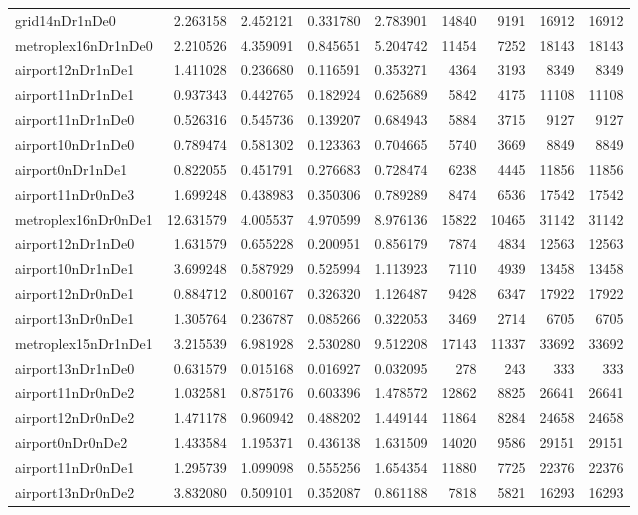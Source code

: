 \begin{longtable}{|l|r|r|r|r|r|r|r|r|}
grid14nDr1nDe0 & 2.263158 & 2.452121 & 0.331780 & 2.783901 & 14840 & 9191 & 16912 & 16912 \\
metroplex16nDr1nDe0 & 2.210526 & 4.359091 & 0.845651 & 5.204742 & 11454 & 7252 & 18143 & 18143 \\
airport12nDr1nDe1 & 1.411028 & 0.236680 & 0.116591 & 0.353271 & 4364 & 3193 & 8349 & 8349 \\
airport11nDr1nDe1 & 0.937343 & 0.442765 & 0.182924 & 0.625689 & 5842 & 4175 & 11108 & 11108 \\
airport11nDr1nDe0 & 0.526316 & 0.545736 & 0.139207 & 0.684943 & 5884 & 3715 & 9127 & 9127 \\
airport10nDr1nDe0 & 0.789474 & 0.581302 & 0.123363 & 0.704665 & 5740 & 3669 & 8849 & 8849 \\
airport0nDr1nDe1 & 0.822055 & 0.451791 & 0.276683 & 0.728474 & 6238 & 4445 & 11856 & 11856 \\
airport11nDr0nDe3 & 1.699248 & 0.438983 & 0.350306 & 0.789289 & 8474 & 6536 & 17542 & 17542 \\
metroplex16nDr0nDe1 & 12.631579 & 4.005537 & 4.970599 & 8.976136 & 15822 & 10465 & 31142 & 31142 \\
airport12nDr1nDe0 & 1.631579 & 0.655228 & 0.200951 & 0.856179 & 7874 & 4834 & 12563 & 12563 \\
airport10nDr1nDe1 & 3.699248 & 0.587929 & 0.525994 & 1.113923 & 7110 & 4939 & 13458 & 13458 \\
airport12nDr0nDe1 & 0.884712 & 0.800167 & 0.326320 & 1.126487 & 9428 & 6347 & 17922 & 17922 \\
airport13nDr0nDe1 & 1.305764 & 0.236787 & 0.085266 & 0.322053 & 3469 & 2714 & 6705 & 6705 \\
metroplex15nDr1nDe1 & 3.215539 & 6.981928 & 2.530280 & 9.512208 & 17143 & 11337 & 33692 & 33692 \\
airport13nDr1nDe0 & 0.631579 & 0.015168 & 0.016927 & 0.032095 & 278 & 243 & 333 & 333 \\
airport11nDr0nDe2 & 1.032581 & 0.875176 & 0.603396 & 1.478572 & 12862 & 8825 & 26641 & 26641 \\
airport12nDr0nDe2 & 1.471178 & 0.960942 & 0.488202 & 1.449144 & 11864 & 8284 & 24658 & 24658 \\
airport0nDr0nDe2 & 1.433584 & 1.195371 & 0.436138 & 1.631509 & 14020 & 9586 & 29151 & 29151 \\
airport11nDr0nDe1 & 1.295739 & 1.099098 & 0.555256 & 1.654354 & 11880 & 7725 & 22376 & 22376 \\
airport13nDr0nDe2 & 3.832080 & 0.509101 & 0.352087 & 0.861188 & 7818 & 5821 & 16293 & 16293 \\

\end{longtable}
